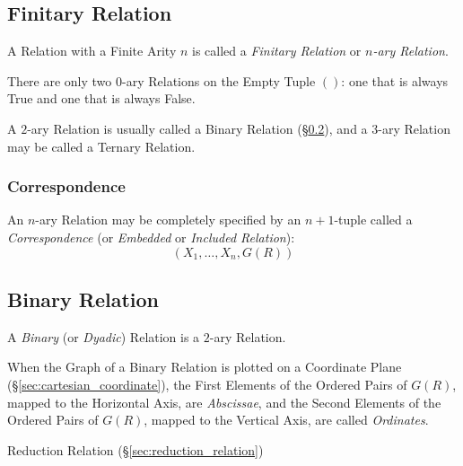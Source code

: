 \subsection{Finitary Relation}\label{sec:finitary_relation}

A Relation with a Finite Arity $n$ is called a \emph{Finitary
  Relation} or \emph{$n$-ary Relation}.

There are only two $0$-ary Relations on the Empty Tuple $()$: one that
is always True and one that is always False.

A $2$-ary Relation is usually called a Binary Relation
(\S\ref{sec:binary_relation}), and a $3$-ary Relation may be called a
Ternary Relation.



\subsubsection{Correspondence}\label{sec:correspondence}

An $n$-ary Relation may be completely specified by an $n + 1$-tuple
called a \emph{Correspondence} (or \emph{Embedded} or \emph{Included
  Relation}):
\[
  (X_1, \ldots, X_n, G(R))
\]



\subsection{Binary Relation}\label{sec:binary_relation}

A \emph{Binary} (or \emph{Dyadic}) Relation is a $2$-ary Relation.

When the Graph of a Binary Relation is plotted on a Coordinate Plane
(\S\ref{sec:cartesian_coordinate}), the First Elements of the Ordered
Pairs of $G(R)$, mapped to the Horizontal Axis, are \emph{Abscissae},
and the Second Elements of the Ordered Pairs of $G(R)$, mapped to the
Vertical Axis, are called \emph{Ordinates}.

Reduction Relation (\S\ref{sec:reduction_relation})

